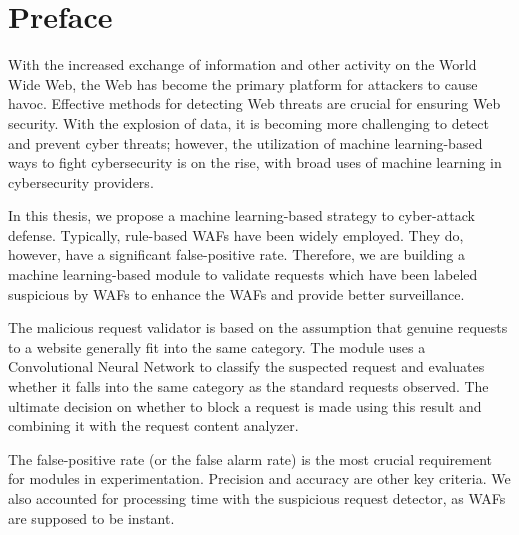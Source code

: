 \chapter*{Preface}
\thispagestyle{fancy}
\label{tom_tat}
\hspace*{5cm}

With the increased exchange of information and other activity on the World Wide Web, the Web has become the primary platform for attackers to cause havoc. Effective methods for detecting Web threats are crucial for ensuring Web security. With the explosion of data, it is becoming more challenging to detect and prevent cyber threats; however, the utilization of machine learning-based ways to fight cybersecurity is on the rise, with broad uses of machine learning in cybersecurity providers. 

In this thesis, we propose a machine learning-based strategy to cyber-attack defense. Typically, rule-based WAFs have been widely employed. They do, however, have a significant false-positive rate. Therefore, we are building a machine learning-based module to validate requests which have been labeled suspicious by WAFs to enhance the WAFs and provide better surveillance. 

The malicious request validator is based on the assumption that genuine requests to a website generally fit into the same category. The module uses a Convolutional Neural Network to classify the suspected request and evaluates whether it falls into the same category as the standard requests observed. The ultimate decision on whether to block a request is made using this result and combining it with the request content analyzer.


The false-positive rate (or the false alarm rate) is the most crucial requirement for modules in experimentation. Precision and accuracy are other key criteria. We also accounted for processing time with the suspicious request detector, as WAFs are supposed to be instant.
	
\cleardoublepage